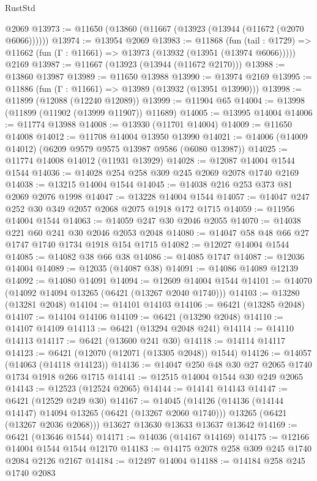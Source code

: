 \begin{lexlean}{RustStd}
\begin{coremodule}
    @2069
@13973 := @11650 (@13860 (@11667 (@13923 (@13944 (@11672 (@2070 @6066))))))
@13974 := @13954 @2069
@13983 := @11868
    (fun (tail : @1729) => @11662 (fun (Γ : @11661) => @13973 (@13932 (@13951 (@13974 @6066)))))
    @2169
@13987 := @11667 (@13923 (@13944 (@11672 @2170)))
@13988 := @13860 @13987
@13989 := @11650 @13988
@13990 := @13974 @2169
@13995 := @11886 (fun (Γ : @11661) => @13989 (@13932 (@13951 @13990)))
@13998 := @11899 (@12088 (@12240 @12089))
@13999 := @11904 @65
@14004 := @13998 (@11899 (@11902 (@13999 @11907)) @11689)
@14005 := @13995 @14004
@14006 := @11774 @13988
@14008 := @13930 (@11701 @14004)
@14009 := @11650 @14008
@14012 := @11708 @14004 @13950 @13990
@14021 := @14006 (@14009 @14012) (@6209 @9579 @9575 @13987 @9586 (@6080 @13987))
@14025 := @11774 @14008 @14012 (@11931 @13929)
@14028 := @12087 @14004 @1544 @1544
@14036 := @14028 @254 @258 @309 @245 @2069 @2078 @1740 @2169
@14038 := @13215 @14004 @1544
@14045 := @14038 @216 @253 @373 @81 @2069 @2076 @1998
@14047 := @13228 @14004 @1544
@14057 := @14047 @247 @252 @30 @349 @2057 @2068 @2075 @1918 @172 @1715
@14059 := @11956 @14004 @1544
@14063 := @14059 @247 @30 @2046 @2055
@14070 := @14038 @221 @60 @241 @30 @2046 @2053 @2048
@14080 := @14047 @58 @48 @66 @27 @1747 @1740 @1734 @1918 @154 @1715
@14082 := @12027 @14004 @1544
@14085 := @14082 @38 @66 @38
@14086 := @14085 @1747
@14087 := @12036 @14004
@14089 := @12035 (@14087 @38)
@14091 := @14086 @14089 @12139
@14092 := @14080 @14091
@14094 := @12609 @14004 @1544
@14101 := @14070 (@14092 @14094 @13265 (@6421 (@13267 @2040 @1740)))
@14103 := @13280 (@13281 @2048)
@14104 := @14101 @14103
@14106 := @6421 (@13285 @2048)
@14107 := @14104 @14106
@14109 := @6421 (@13290 @2048)
@14110 := @14107 @14109
@14113 := @6421 (@13294 @2048 @241)
@14114 := @14110 @14113
@14117 := @6421 (@13600 @241 @30)
@14118 := @14114 @14117
@14123 := @6421 (@12070 (@12071 (@13305 @2048)) @1544)
@14126 := @14057 (@14063 (@14118 @14123))
@14136 := @14047 @250 @48 @30 @27 @2065 @1740 @1734 @1918 @266 @1715
@14141 := @12515 @14004 @1544 @30 @249 @2065
@14143 := @12523 (@12524 @2065)
@14144 := @14141 @14143
@14147 := @6421 (@12529 @249 @30)
@14167 := @14045
    (@14126
      (@14136 (@14144 @14147) @14094 @13265 (@6421 (@13267 @2060 @1740)))
      @13265
      (@6421 (@13267 @2036 @2068)))
    @13627
    @13630
    @13633
    @13637
    @13642
@14169 := @6421 (@13646 @1544)
@14171 := @14036 (@14167 @14169)
@14175 := @12166 @14004 @1544 @1544 @12170
@14183 := @14175 @2078 @258 @309 @245 @1740 @2084 @2126 @2167
@14184 := @12497 @14004
@14188 := @14184 @258 @245 @1740 @2083

\end{coremodule}
\end{lexlean}
